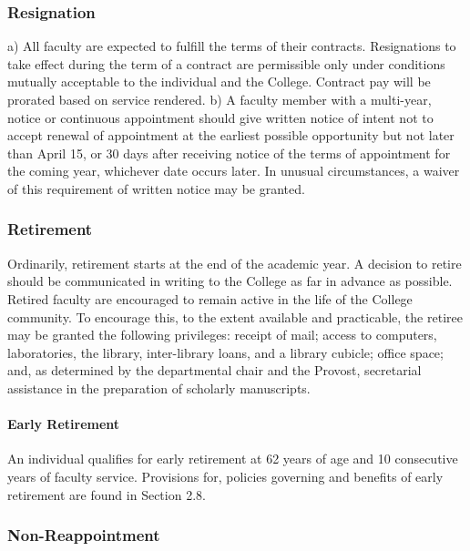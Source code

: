 \documentclass[letterpaper, 11pt]{article}
\begin{document}
		\subsubsection{Resignation}
			a) All faculty are expected to fulfill the terms of their contracts.  Resignations to take effect during the term of a contract are permissible only under conditions mutually acceptable to the individual and the College.  Contract pay will be prorated based on service rendered.
			b) A faculty member with a multi-year, notice or continuous appointment should give written notice of intent not to accept renewal of appointment at the earliest possible opportunity but not later than April 15, or 30 days after receiving notice of the terms of appointment for the coming year, whichever date occurs later. In unusual circumstances, a waiver of this requirement of written notice may be granted.
		\subsubsection{Retirement}
			Ordinarily, retirement starts at the end of the academic year.  A decision to retire should be communicated in writing to the College as far in advance as possible.  Retired faculty are encouraged to remain active in the life of the College community.  To encourage this, to the extent available and practicable, the retiree may be granted the following privileges:  receipt of mail; access to computers, laboratories, the library, inter-library loans, and a library cubicle; office space; and, as determined by the departmental chair and the Provost, secretarial assistance in the preparation of scholarly manuscripts.
			\paragraph{Early Retirement}
				An individual qualifies for early retirement at 62 years of age and 10 consecutive years of faculty service.  Provisions for, policies governing and benefits of early retirement are found in Section 2.8.
		\subsubsection{Non-Reappointment}
\end{document}
